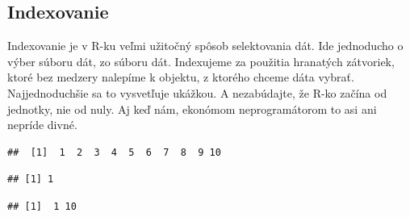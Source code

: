 \hypertarget{indexovanie}{%
\subsection{Indexovanie}\label{indexovanie}}

Indexovanie je v R-ku veľmi užitočný spôsob selektovania dát. Ide
jednoducho o výber súboru dát, zo súboru dát. Indexujeme za použitia
hranatých zátvoriek, ktoré bez medzery nalepíme k objektu, z ktorého
chceme dáta vybrať. Najjednoduchšie sa to vysvetľuje ukážkou. A
nezabúdajte, že R-ko začína od jednotky, nie od nuly. Aj keď nám,
ekonómom neprogramátorom to asi ani nepríde divné.

\begin{Shaded}
\begin{Highlighting}[]

\StringTok{ }\NormalTok{(}\OperatorTok{:}\NormalTok{)}

\end{Highlighting}
\end{Shaded}

\begin{verbatim}
##  [1]  1  2  3  4  5  6  7  8  9 10
\end{verbatim}

\begin{Shaded}
\begin{Highlighting}[]

\NormalTok{obycajny_vektor[}\NormalTok{]}
\end{Highlighting}
\end{Shaded}

\begin{verbatim}
## [1] 1
\end{verbatim}

\begin{Shaded}
\begin{Highlighting}[]

\NormalTok{obycajny_vektor[}\NormalTok{(}\NormalTok{, }\NormalTok{)]}
\end{Highlighting}
\end{Shaded}

\begin{verbatim}
## [1]  1 10
\end{verbatim}

